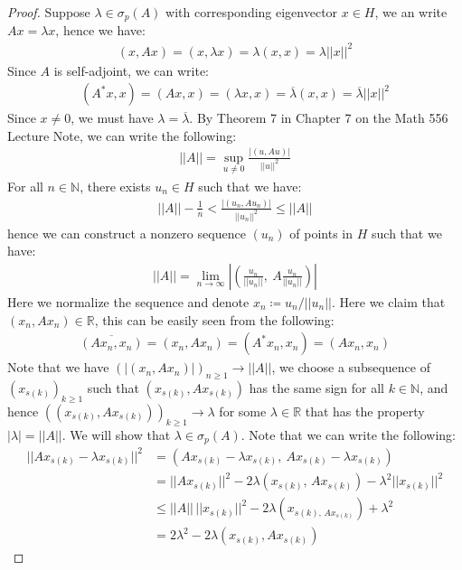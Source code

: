 \documentclass[11pt]{book}
\theoremstyle{break}
\theoremstyle{break}
\newcommand{\R}{\mathbb{R}}
\newcommand{\N}{\mathbb{N}}
\begin{document}
\begin{proof}
Suppose $\lambda \in \sigma_p(A)$ with corresponding eigenvector $x \in H$, we an write $Ax = \lambda x$, hence we have:
\begin{align*}
(x,Ax) = (x,\lambda x) = \lambda (x,x) = \lambda ||x||^2 
\end{align*}
Since $A$ is self-adjoint, we can write:
\begin{align*}
(A^*x, x) =(Ax,x)= (\lambda x , x)=\overline{\lambda}(x,x) = \overline{\lambda}||x||^2
\end{align*}
Since $x \neq 0$, we must have $\lambda = \overline{\lambda}$. By Theorem 7 in Chapter 7 on the Math 556 Lecture Note, we can write the following:
\begin{align*}
||A|| = \sup_{u\neq 0}\frac{|(u,Au)|}{||u||^2}
\end{align*}
For all $n \in \N$, there exists $u_n \in H$ such that we have:
\begin{align*}
||A|| - \frac{1}{n} < \frac{|(u_n, Au_n)|}{||u_n||^2} \leq ||A||
\end{align*}
hence we can construct a nonzero sequence $(u_n)$ of points in $H$ such that we have:
\begin{align}
||A|| = \lim_{n\to \infty}\left|\left(\frac{u_n}{||u_n||},\ A\frac{u_n}{||u_n||}\right)\right|
\end{align}
Here we normalize the sequence and denote $x_n \coloneqq u_n/||u_n||$. Here we claim that $(x_n , Ax_n) \in \R$, this can be easily seen from the following:
\begin{align*}
\overline{(Ax_n, x_n)}= (x_n , Ax_n) =(A^* x_n, x_n) =(Ax_n, x_n)
\end{align*}
Note that we have $(|(x_n, Ax_n)|)_{n\geq 1} \to ||A||$, we choose a subsequence of $(x_{s(k)})_{k\geq 1}$ such that $(x_{s(k)}, Ax_{s(k)})$ has the same sign for all $k \in \N$, and hence $\left((x_{s(k)}, Ax_{s(k)})\right)_{k\geq 1} \to \lambda$ for some $\lambda \in \R$ that has the property $|\lambda | = ||A||$. We will show that $\lambda \in \sigma_p(A)$. Note that we can write the following:
\begin{align}
||Ax_{s(k)} - \lambda x_{s(k)}||^2 &= \left(Ax_{s(k)}-\lambda x_{s(k)}, \ Ax_{s(k)} - \lambda x_{s(k)}\right)\\
&= ||Ax_{s(k)}||^2 - 2\lambda (x_{s(k)}, \, Ax_{s(k)}) - \lambda^2 ||x_{s(k)}||^2\\
&\leq ||A|| \, ||x_{s(k)}||^2 - 2\lambda (x_{s(k), \, Ax_{s(k)}}) + \lambda^2\\
&= 2\lambda^2 - 2\lambda (x_{s(k)}, Ax_{s(k)})

\end{align}
\end{proof}
\end{document}
